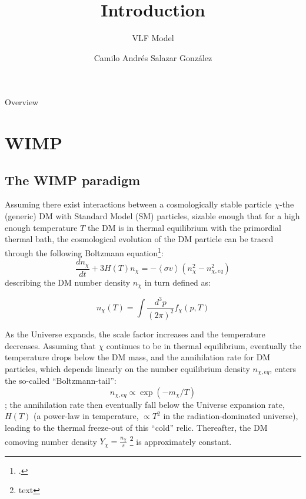 \documentclass[compress,xcolor=table]{beamer}
\title{Introduction}
\subtitle{VLF Model} %
\date{\formatdate{22}{03}{2020}}
\author{Camilo Andrés Salazar González}
\institute{Physics Institute} %
\begin{document}
\begin{frame}[plain]
	\titlepage
	\setcounter{framenumber}{0}
\end{frame}

\begin{frame}[allowframebreaks]{Overview}
\tableofcontents
\end{frame}

\section{WIMP} 


\subsection{The WIMP paradigm}

\begin{frame}{}
Assuming there exist interactions between a cosmologically stable particle $\chi$-the (generic) DM with Standard Model (SM) particles, sizable enough that for a high enough temperature $T$ the DM is in thermal equilibrium with the primordial thermal bath, the cosmological evolution of the DM particle can be traced through the following Boltzmann equation\footcite{Arcadi2017}:
\[
\frac{dn_{\chi}}{dt}+3H(T)n_{\chi}=-\left\langle \sigma v \right\rangle \left(n^2_{\chi}-n^2_{\chi,eq}\right)
\]
describing the DM number density $n_{\chi}$ in turn defined as:

\[
n_{\chi}(T)=\int\frac{d^3p}{(2\pi)^2}f_{\chi}(p,T)
\]

\end{frame}


\begin{frame}{}


As the Universe expands, the scale factor increases and the temperature decreases. Assuming that $\chi$ continues to be in thermal equilibrium, eventually the temperature drops below the DM mass, and the annihilation rate for DM particles, which depends linearly on the number equilibrium density $n_{\chi,eq}$, enters the so-called “Boltzmann-tail”: 
\[
n_{\chi,eq}\propto\exp(-m_{\chi}/T)
\]; 
the annihilation rate then eventually fall below the Universe expansion rate, $H(T)$ (a power-law in temperature, $\propto T^2$ in the radiation-dominated universe), leading to the thermal freeze-out of this “cold” relic. Thereafter, the DM comoving number density $Y_{\chi}=\frac{n_{\chi}}{s}$ \footnote{text} is approximately constant.

\end{frame}
\end{document}
